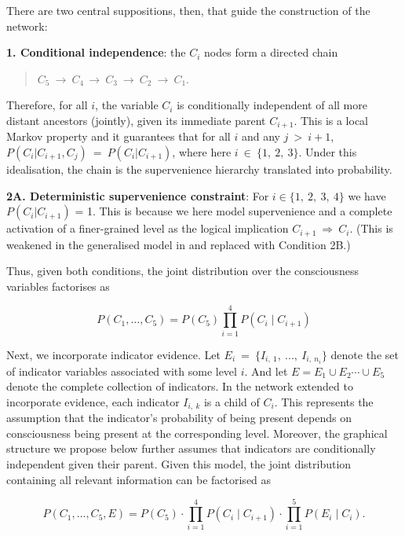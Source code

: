 \documentclass[11pt, a4paper, onecolumn, gdm]{google}
\begin{document}
There are two central suppositions, then, that guide the construction of the network:

\textbf{1. Conditional independence}: the \(C_{i}\) nodes form a directed chain

\begin{quote}
\(C_{5}\  \rightarrow \ C_{4\ } \rightarrow \ C_{3}\  \rightarrow \ C_{2}\  \rightarrow \ C_{1}.\)
\end{quote}

Therefore, for all \(i\), the variable \(C_{i}\) is conditionally independent of all more distant ancestors (jointly), given its immediate parent \(C_{i + 1}\).
This is a local Markov property \citep{pearl1988} and it guarantees that for all \(i\) and any \(j\  > \ i + 1\), \(P(C_{i}|C_{i + 1},C_{j})\  = \ P(C_{i}|C_{i + 1})\), where here \(i\  \in \ \{ 1,\ 2,\ 3\}\).
Under this idealisation, the chain is the supervenience hierarchy translated into probability.

\textbf{2A. Deterministic supervenience constraint}: For \(i \in \{ 1,\ 2,\ 3,\ 4\}\) we have \(P(C_{i}|C_{i + 1})\) = 1.
This is because we here model supervenience and a complete activation of a finer-grained level as the logical implication \(C_{i + 1}\  \Rightarrow {\ C}_{i}\).
(This is weakened in the generalised model in  and replaced with Condition 2B.)

Thus, given both conditions, the joint distribution over the consciousness variables factorises as

\[
P\left( C_{1},\ldots,C_{5} \right) = P\left( C_{5} \right)\prod_{i = 1}^{4}P\left( C_{i} \mid C_{i + 1} \right)
\]

Next, we incorporate indicator evidence.
Let \(E_{i}\  = \ \{ I_{i,\ 1},\ ...,\ I_{i,{\ n}_{i}}\}\) denote the set of indicator variables associated with some level \(i\).
And let \(E = E_{1} \cup E_{2}\cdots \cup E_{5}\) denote the complete collection of indicators.
In the network extended to incorporate evidence, each indicator \(I_{i,\ k}\) is a child of \(C_{i}\).
This represents the assumption that the indicator's probability of being present depends on consciousness being present at the corresponding level.
Moreover, the graphical structure we propose below further assumes that indicators are conditionally independent given their parent.
Given this model, the joint distribution containing all relevant information can be factorised as

\[
P\left( C_{1},\ldots,C_{5},E \right) = P\left( C_{5} \right) \cdot \prod_{i = 1}^{4}P\left( C_{i} \mid C_{i + 1} \right) \cdot \prod_{i = 1}^{5}P\left( E_{i} \mid C_{i} \right).
\]
\end{document}
